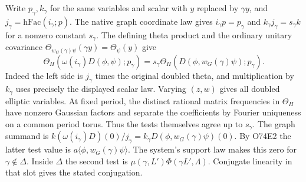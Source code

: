 Write $p_\gamma,k_\gamma$
for the same variables and scalar with $y$ replaced by $\gamma y$,
and $j_\gamma=\mathrm{hFac}(i_\gamma;p)$. The native graph coordinate
law gives $i_\gamma p=p_\gamma$ and $k_\gamma j_\gamma=s_\gamma k$
for a nonzero constant $s_\gamma$. The defining theta product and the
ordinary unitary covariance $\Theta_{w_G(\gamma)\psi}(\gamma y)=\Theta_\psi(y)$
give
\[
 \Theta_H(\omega(i_\gamma)D(\phi,\psi);p_\gamma)
  =s_\gamma\Theta_H(D(\phi,w_G(\gamma)\psi);p_\gamma).
\]
Indeed the left side is $j_\gamma$ times the original doubled theta,
and multiplication by $k_\gamma$ uses precisely the displayed scalar
law. Varying $(z,w)$ gives all doubled elliptic variables. At fixed
period, the distinct rational matrix frequencies in $\Theta_H$ have
nonzero Gaussian factors and separate the coefficients by Fourier
uniqueness on a common period torus. Thus the tests themselves agree
up to $s_\gamma$. The graph summand is
$k(\omega(i_\gamma)D)(0)/j_\gamma
 =k_\gamma D(\phi,w_G(\gamma)\psi)(0)$.
By O74E2 the latter test value is $a\langle\phi,w_G(\gamma)\psi\rangle$.
The system's support law makes this zero for $\gamma\notin\Delta$.
Inside $\Delta$ the second test is $\mu(\gamma,L')\Phi(\gamma L',\Lambda)$.
Conjugate linearity in that slot gives the stated conjugation.

